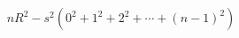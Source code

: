 \documentclass[preview]{standalone}
\begin{document}
\begin{align*}
nR^2 - s^2(0^2+1^2+2^2+\cdots+(n-1)^2)
\end{align*}
\end{document}
